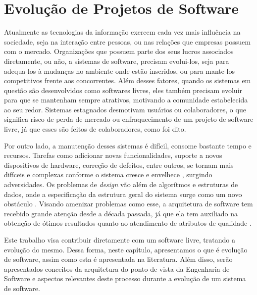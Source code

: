 \chapter{Evolução de Projetos de Software}

Atualmente as tecnologias da informação exercem cada vez mais influência na sociedade, seja na interação entre pessoas, ou nas relações que empresas possuem com o mercado. Organizações que possuem parte dos seus lucros associados diretamente, ou não, a sistemas de software, precisam evolui-los, seja para adequa-los à mudanças no ambiente onde estão inseridos, ou para mante-los competitivos frente aos concorrentes. Além desses fatores, quando os sistemas em questão são desenvolvidos como softwares livres, eles também precisam evoluir para que se mantenham sempre atrativos, motivando a comunidade estabelecida ao seu redor. Sistemas estagnados desmotivam usuários ou colaboradores, o que significa risco de perda de mercado ou enfraquecimento de um projeto de software livre, já que esses são feitos de colaboradores, como foi dito.

Por outro lado, a manutenção desses sistemas é difícil, consome bastante tempo e recursos. Tarefas como adicionar novas funcionalidades, suporte a novos dispositivos de hardware, correção de defeitos, entre outros, se tornam mais difíceis e complexas conforme o sistema cresce e envelhece \cite{godfrey2000evolution}, surgindo adversidades. Os problemas de \textit{design} vão além de algorítmos e estruturas de dados, onde a especificação da estrutura geral do sistema surge como um novo obstáculo \cite{garlan1993introduction}. Visando amenizar problemas como esse, a arquitetura de software tem recebido grande atenção  desde a década passada, já que ela tem auxiliado na obtenção de ótimos resultados quanto ao atendimento de atributos de qualidade \cite{fabricio2009instrumentation}.

Este trabalho visa contribuir diretamente com um software livre, tratando a evolução do mesmo. Dessa forma, neste capítulo, apresentamos o que é evolução de software, assim como esta é  apresentada na literatura. Além disso, serão apresentados conceitos da arquitetura do ponto de vista da Engenharia de Software e aspectos relevantes deste processo durante a evolução de um sistema de software. %


